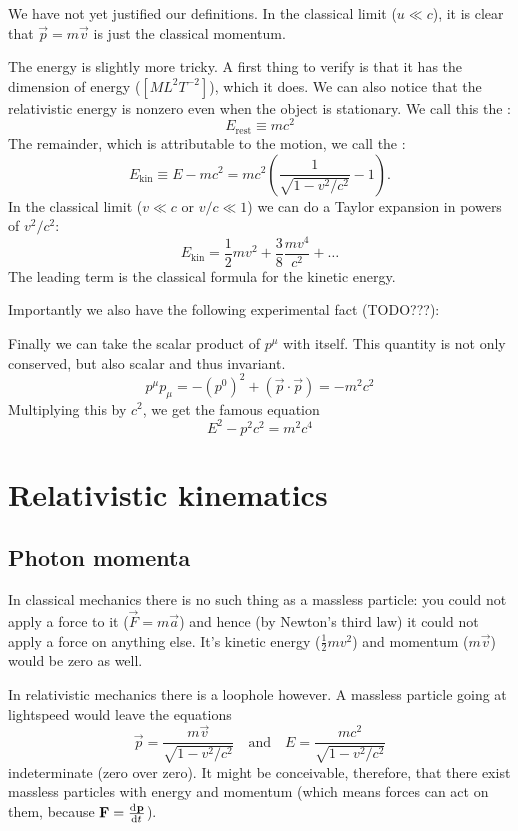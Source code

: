 We have not yet justified our definitions. In the classical limit ($u \ll c$), it is clear that $\vec{p} = m\vec{v}$ is just the classical momentum.

The energy is slightly more tricky. A first thing to verify is that it has the dimension of energy ($[ML^2T^{-2}]$), which it does. We can also notice that the relativistic energy is nonzero even when the object is stationary. We call this the :
\[E_\text{rest} \equiv mc^2\]
The remainder, which is attributable to the motion, we call the :
\[ E_\text{kin} \equiv E - mc^2 = mc^2 \left(\frac{1}{\sqrt{1-v^2/c^2}}-1\right).\]
In the classical limit ($v \ll c$ or $v/c \ll 1$) we can do a Taylor expansion in powers of $v^2/c^2$:
\[ E_\text{kin} = \frac{1}{2} mv^2 + \frac{3}{8}\frac{mv^4}{c^2} + \ldots \]
The leading term is the classical formula for the kinetic energy.

Importantly we also have the following experimental fact (TODO???):

Finally we can take the scalar product of $p^\mu$ with itself. This quantity is not only conserved, but also scalar and thus invariant.
\[ p^\mu p_\mu = -(p^0)^2 + (\vec{p}\cdot\vec{p}) = -m^2c^2 \]
Multiplying this by $c^2$, we get the famous equation
\[ \boxed{E^2 - p^2c^2 = m^2c^4} \]

\section{Relativistic kinematics}
\subsection{Photon momenta}
In classical mechanics there is no such thing as a massless particle: you could not apply a force to it ($\vec{F} = m \vec{a}$) and hence (by Newton's third law) it could not apply a force on anything else. It's kinetic energy ($\frac{1}{2}mv^2$) and momentum ($m\vec{v}$) would be zero as well.

In relativistic mechanics there is a loophole however. A massless particle going at lightspeed would leave the equations
\[ \vec{p} = \frac{m \vec{v}}{\sqrt{1-v^2/c^2}} \quad \text{and} \quad E = \frac{mc^2}{\sqrt{1-v^2/c^2}} \]
indeterminate (zero over zero). It might be conceivable, therefore, that there exist massless particles with energy and momentum (which means forces can act on them, because $\vec{F} = \od{\vec{p}}{t}$).

